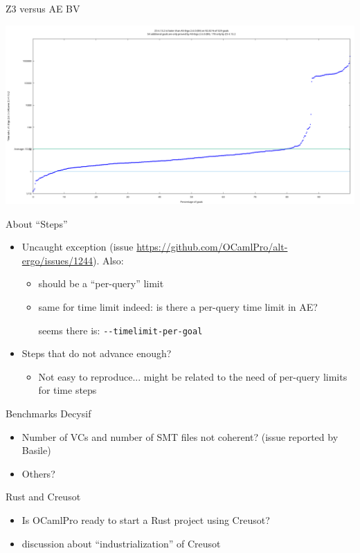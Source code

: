 \documentclass[aspectratio=169]{beamer}
\begin{document}
\begin{frame}{Z3 versus AE BV}

  \includegraphics[width=\textwidth]{Z3vsAEBV.png}

\end{frame}

\begin{frame}{About ``Steps''}

  \begin{itemize}
  \item Uncaught exception (issue
    \url{https://github.com/OCamlPro/alt-ergo/issues/1244}). Also:
    \begin{itemize}
    \item should be a ``per-query'' limit
    \item same for time limit indeed: is there a per-query time limit in AE?

      seems there is: \texttt{-{}-timelimit-per-goal}
    \end{itemize}
  \item Steps that do not advance enough?
    \begin{itemize}
    \item Not easy to reproduce... might be related to the need of
      per-query limits for time steps
    \end{itemize}
  \end{itemize}

\end{frame}


\begin{frame}{Benchmarks Decysif}

  \begin{itemize}
  \item Number of VCs and number of SMT files not coherent? (issue reported by Basile)
  \item Others?
  \end{itemize}

\end{frame}


\begin{frame}{Rust and Creusot}

  \begin{itemize}
  \item Is OCamlPro ready to start a Rust project using Creusot?
  \item{} discussion about ``industrialization'' of Creusot
  \end{itemize}

\end{frame}
\end{document}
